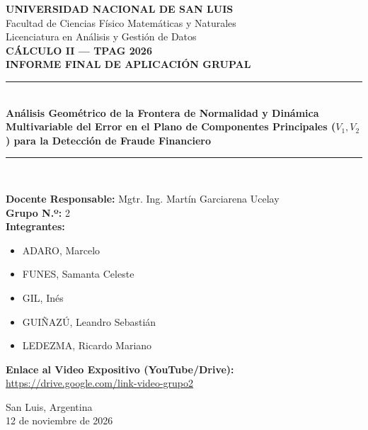 \documentclass[12pt,a4paper]{article}
\begin{document}
\begin{titlepage}
    \centering
    \vspace*{0.5cm}
    {\Large \textbf{UNIVERSIDAD NACIONAL DE SAN LUIS}}\\[0.3cm]
    {\large Facultad de Ciencias Físico Matemáticas y Naturales}\\[0.2cm]
    {\large Licenciatura en Análisis y Gestión de Datos}\\[1.2cm]
    
    {\Large \textbf{CÁLCULO II --- TPAG 2026}}\\[0.4cm]
    {\Large \textbf{INFORME FINAL DE APLICACIÓN GRUPAL}}\\[1.2cm]
    
    \rule{\textwidth}{1pt}\\[0.4cm]
    {\Large \textbf{Análisis Geométrico de la Frontera de Normalidad y Dinámica Multivariable del Error en el Plano de Componentes Principales ($V_1, V_2$) para la Detección de Fraude Financiero}}\\[0.2cm]
    \rule{\textwidth}{1pt}\\[1.5cm]
    
    \begin{flushleft}
    \textbf{Docente Responsable:} Mgtr. Ing. Martín Garciarena Ucelay\\[0.3cm]
    \textbf{Grupo N.º:} 2\\[0.3cm]
    \textbf{Integrantes:}\\[0.1cm]
    \begin{itemize}
        \item ADARO, Marcelo
        \item FUNES, Samanta Celeste
        \item GIL, Inés
        \item GUIÑAZÚ, Leandro Sebastián
        \item LEDEZMA, Ricardo Mariano
    \end{itemize}
    \textbf{Enlace al Video Expositivo (YouTube/Drive):} \url{https://drive.google.com/link-video-grupo2}
    \end{flushleft}
    
    \vfill
    {\large San Luis, Argentina \\ 12 de noviembre de 2026}
\end{titlepage}
\end{document}

